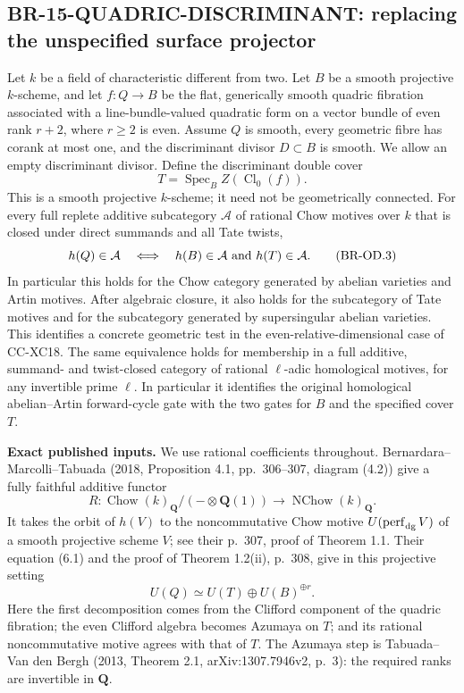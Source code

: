 \subsection{BR-15-QUADRIC-DISCRIMINANT: replacing the unspecified surface projector}
Let $k$ be a field of characteristic different from two. Let $B$ be a
smooth projective $k$-scheme, and let $f:Q\to B$ be the flat, generically
smooth quadric
fibration associated with a line-bundle-valued quadratic form on a
vector bundle of even rank $r+2$, where $r\ge2$ is even. Assume $Q$ is
smooth, every geometric fibre has corank at most one, and the
discriminant divisor $D\subset B$ is smooth. We allow an empty
discriminant divisor. Define the discriminant double cover
\[
 T=\operatorname{Spec}_B Z(\operatorname{Cl}_0(f)). \tag{BR-OD.2}
\]
This is a smooth projective $k$-scheme; it need not be geometrically
connected. For every full replete additive subcategory $\mathcal A$ of
rational Chow motives over $k$ that is closed under direct summands and
all Tate twists,
\[
 h(Q)\in\mathcal A
 \quad\Longleftrightarrow\quad
 h(B)\in\mathcal A\ \hbox{and}\ h(T)\in\mathcal A. \tag{BR-OD.3}
\]
In particular this holds for the Chow category generated by abelian
varieties and Artin motives. After algebraic closure, it also holds for
the subcategory of Tate motives and for the subcategory generated by
supersingular abelian varieties. This identifies a concrete geometric
test in the even-relative-dimensional case of CC-XC18.
The same equivalence holds for membership in a full additive,
summand- and twist-closed category of rational $\ell$-adic homological
motives, for any invertible prime $\ell$. In particular it identifies
the original homological abelian--Artin forward-cycle gate with the
two gates for $B$ and the specified cover $T$.

\textbf{Exact published inputs.} We use rational coefficients throughout.
Bernardara--Marcolli--Tabuada (2018, Proposition 4.1, pp.~306--307,
diagram (4.2)) give a fully faithful additive functor
\[
 R:\operatorname{Chow}(k)_{\mathbf Q}/(-\otimes\mathbf Q(1))
   \longrightarrow\operatorname{NChow}(k)_{\mathbf Q}.
 \tag{BR-OD.4}
\]
It takes the orbit of $h(V)$ to the noncommutative Chow motive
$U(\operatorname{perf}_{\rm dg}V)$ of a smooth projective scheme $V$;
see their p.~307, proof of Theorem 1.1. Their equation (6.1) and the
proof of Theorem 1.2(ii), p.~308, give in this projective setting
\[
 U(Q)\simeq U(T)\oplus U(B)^{\oplus r}.
 \tag{BR-OD.5}
\]
Here the first decomposition comes from the Clifford component of the
quadric fibration; the even Clifford algebra becomes Azumaya on $T$;
and its rational noncommutative motive agrees with that of $T$.
The Azumaya step is Tabuada--Van den Bergh (2013, Theorem 2.1,
arXiv:1307.7946v2, p.~3): the required ranks are invertible in
$\mathbf Q$.

